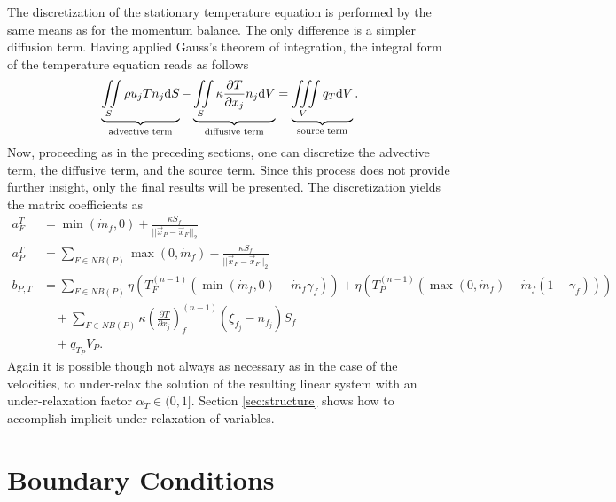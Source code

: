 The discretization of the stationary temperature equation is performed by the same means as for the momentum balance. The only difference is a simpler diffusion term. Having applied Gauss's theorem of integration, the integral form of the temperature equation reads as follows
\begin{displaymath}
  \underbrace{ \iint\limits_S \rho u_j T n_j \mathrm{d}S }_{\text{advective term}}
  - \underbrace{ \iint\limits_S \kappa \frac{\partial T}{\partial x_j} n_j \mathrm{d}V }_{\text{diffusive term}}
  = \underbrace{\iiint\limits_V \vphantom{\frac{ T}{ x_j} } q_T \mathrm{d}V }_{\text{source term}}.
\end{displaymath}
Now, proceeding as in the preceding sections, one can discretize the advective term, the diffusive term, and the source term. Since this process does not provide further insight, only the final results will be presented. The discretization yields the matrix coefficients as
  \begin{align*}
    a_F^{T} &= \min(\dot{m}_f,0) + \frac{\kappa S_f}{||\vec{x}_P - \vec{x}_F||_2} \\[1em]
    a_P^{T} &= \sum_{F \in NB(P)}\max(0,\dot{m}_f) - \frac{\kappa S_f}{||\vec{x}_P - \vec{x}_F||_2} \\[1em]
    b_{P,T} &= \sum_{F \in NB(P)} \eta  \left(T_F^{(n-1)} \left( \min(\dot{m}_f,0) - \dot{m}_f \gamma_f \right)\right) 
                                + \eta \left( T_{P}^{(n-1)} \left( \max(0,\dot{m}_f) - \dot{m}_f \left(1 - \gamma_f\right) \right)\right) \nonumber \\[0.5em]
            &\quad + \sum_{F \in NB(P)} \kappa \left( \frac{\partial T}{\partial x_j}\right)_f^{(n-1)} \left(\xi_{f_j} - n_{f_j}\right)S_f \nonumber \\[0.5em]
            &\quad + q_{T_P} V_P.
  \end{align*}
Again it is possible though not always as necessary as in the case of the velocities, to under-relax the solution of the resulting linear system with an under-relaxation factor \(\alpha_T \in (0,1]\). Section \ref{sec:structure} shows how to accomplish implicit under-relaxation of variables.

\section{Boundary Conditions}
\label{sec:segboundary}

